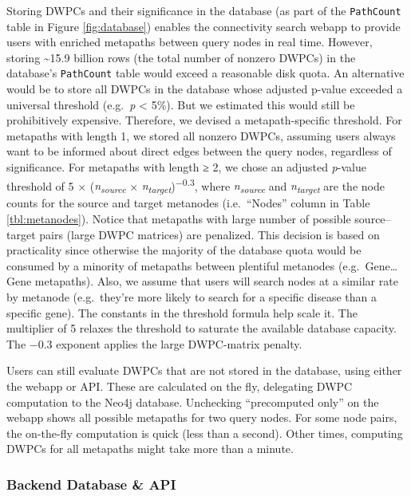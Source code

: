 Storing DWPCs and their significance in the database (as part of the \texttt{PathCount} table in Figure \ref{fig:database}) enables the connectivity search webapp to provide users with enriched metapaths between query nodes in real time.
However, storing \textasciitilde15.9 billion rows (the total number of nonzero DWPCs) in the database's \texttt{PathCount} table would exceed a reasonable disk quota.
An alternative would be to store all DWPCs in the database whose adjusted p-value exceeded a universal threshold (e.g.~\emph{p} \textless{} 5\%).
But we estimated this would still be prohibitively expensive.
Therefore, we devised a metapath-specific threshold.
For metapaths with length 1, we stored all nonzero DWPCs,
assuming users always want to be informed about direct edges between the query nodes, regardless of significance.
For metapaths with length ≥ 2, we chose an adjusted \emph{p}-value threshold of
5 × (\emph{n\textsubscript{source}} × \emph{n\textsubscript{target}})\textsuperscript{−0.3},
where \emph{n\textsubscript{source}} and \emph{n\textsubscript{target}} are the node counts for the source and target metanodes (i.e.~``Nodes'' column in Table \ref{tbl:metanodes}).
Notice that metapaths with large number of possible source--target pairs (large DWPC matrices) are penalized.
This decision is based on practicality since otherwise the majority of the database quota would be consumed by a minority of metapaths between plentiful metanodes (e.g.~Gene\ldots Gene metapaths).
Also, we assume that users will search nodes at a similar rate by metanode (e.g.~they're more likely to search for a specific disease than a specific gene).
The constants in the threshold formula help scale it.
The multiplier of 5 relaxes the threshold to saturate the available database capacity.
The −0.3 exponent applies the large DWPC-matrix penalty.

Users can still evaluate DWPCs that are not stored in the database, using either the webapp or API.
These are calculated on the fly, delegating DWPC computation to the Neo4j database.
Unchecking ``precomputed only'' on the webapp shows all possible metapaths for two query nodes.
For some node pairs, the on-the-fly computation is quick (less than a second).
Other times, computing DWPCs for all metapaths might take more than a minute.

\hypertarget{backend-database-api}{%
\subsubsection{Backend Database \& API}\label{backend-database-api}}


